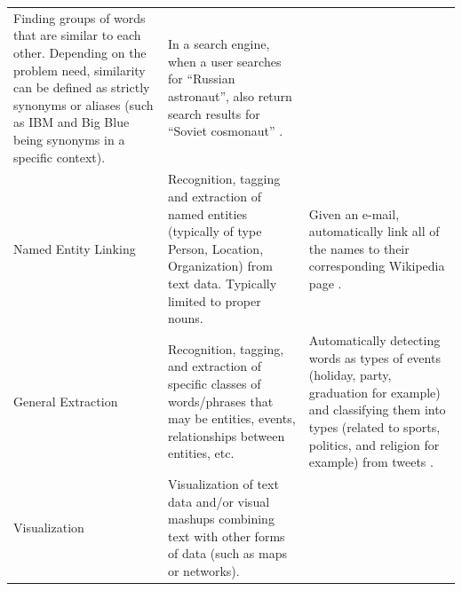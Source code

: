 \documentclass[]{krantz}
\begin{document}
\begin{longtable}[]{@{}lll@{}}
\begin{minipage}[t]{0.16\columnwidth}
Finding groups of words that are similar to each other. Depending on the
problem need, similarity can be defined as strictly synonyms or aliases
(such as IBM and Big Blue being synonyms in a specific context).\strut
\end{minipage} & \begin{minipage}[t]{0.63\columnwidth}\raggedright\strut
In a search engine, when a user searches for ``Russian astronaut'', also
return search results for ``Soviet cosmonaut'' \citep{Zeng-2012}.\strut
\end{minipage}\tabularnewline
\begin{minipage}[t]{0.12\columnwidth}\raggedright\strut
Named Entity Linking\strut
\end{minipage} & \begin{minipage}[t]{0.16\columnwidth}\raggedright\strut
Recognition, tagging and extraction of named entities (typically of type
Person, Location, Organization) from text data. Typically limited to
proper nouns.\strut
\end{minipage} & \begin{minipage}[t]{0.63\columnwidth}\raggedright\strut
Given an e-mail, automatically link all of the names to their
corresponding Wikipedia page \citep{ferragina-10}.\strut
\end{minipage}\tabularnewline
\begin{minipage}[t]{0.12\columnwidth}\raggedright\strut
General Extraction\strut
\end{minipage} & \begin{minipage}[t]{0.16\columnwidth}\raggedright\strut
Recognition, tagging, and extraction of specific classes of
words/phrases that may be entities, events, relationships between
entities, etc.\strut
\end{minipage} & \begin{minipage}[t]{0.63\columnwidth}\raggedright\strut
Automatically detecting words as types of events (holiday, party,
graduation for example) and classifying them into types (related to
sports, politics, and religion for example) from tweets
\citep{Ritter2012}.\strut
\end{minipage}\tabularnewline
\begin{minipage}[t]{0.12\columnwidth}\raggedright\strut
Visualization\strut
\end{minipage} & \begin{minipage}[t]{0.16\columnwidth}\raggedright\strut
Visualization of text data and/or visual mashups combining text with
other forms of data (such as maps or networks).\strut

\end{minipage}
\end{longtable}
\end{document}
